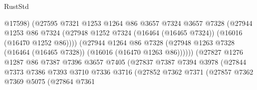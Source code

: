 \begin{lexlean}{RustStd}
\begin{coremodule}
                                      @17598)
                                    (@27595
                                      @7321
                                      @1253
                                      @1264
                                      @86
                                      @3657
                                      @7324
                                      @3657
                                      @7328
                                      (@27944
                                        @1253
                                        @86
                                        @7324
                                        (@27948
                                          @1252
                                          @7324
                                          (@16464 (@16465 @7324))
                                          (@16016 (@16470 @1252 @86))))
                                      (@27944
                                        @1264
                                        @86
                                        @7328
                                        (@27948
                                          @1263
                                          @7328
                                          (@16464 (@16465 @7328))
                                          (@16016 (@16470 @1263 @86))))))
                                  (@27827
                                    @1276
                                    @1287
                                    @86
                                    @7387
                                    @7396
                                    @3657
                                    @7405
                                    (@27837
                                      @7387
                                      @7394
                                      @3978
                                      (@27844
                                        @7373
                                        @7386
                                        @7393
                                        @3710
                                        @7336
                                        @3716
                                        (@27852
                                          @7362
                                          @7371
                                          (@27857
                                            @7362
                                            @7369
                                            @5075
                                            (@27864
                                              @7361

\end{coremodule}
\end{lexlean}
